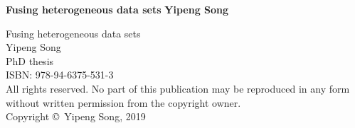 {\pagestyle{empty}
\newcommand{\printtitle}{%
{\Huge\bf Fusing heterogeneous data sets}}  %

\begin{titlepage}
\par\vskip 2cm
\begin{center}
\printtitle
\vskip 2cm
{\LARGE\bf Yipeng Song}                           %
\vfill
\end{center}
\end{titlepage}

\newpage
\noindent%
{
\vfill
\noindent%
Fusing heterogeneous data sets \\
Yipeng Song \\
PhD thesis \\
ISBN: 978-94-6375-531-3 \\[2ex]     %

\noindent%
All rights reserved. No part of this publication may be reproduced in any form
without written permission from the copyright owner.\\[2ex]

\noindent%
Copyright \copyright\ Yipeng Song, 2019 \\[2ex] %

\vskip 2cm
}

}
